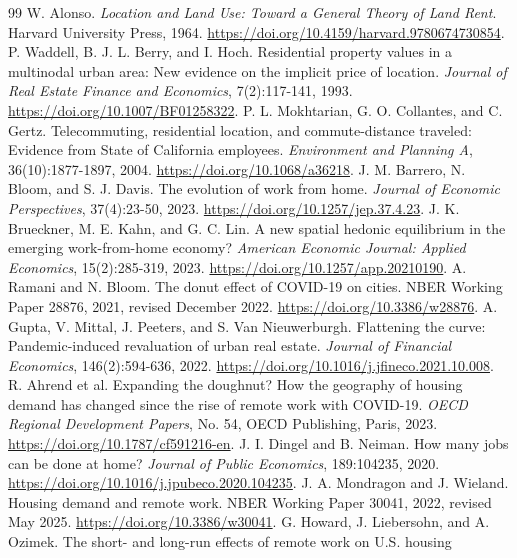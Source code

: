 \documentclass[11pt]{article}
\begin{document}
\clearpage
\footnotesize
\begin{thebibliography}{99}
\setlength{\itemsep}{3pt}
\setlength{\parsep}{0pt}
 W. Alonso. \textit{Location and Land Use: Toward a General Theory of Land Rent}. Harvard University
Press, 1964. \url{https://doi.org/10.4159/harvard.9780674730854}.
 P. Waddell, B. J. L. Berry, and I. Hoch. Residential property values in a multinodal urban area:
New evidence on the implicit price of location. \textit{Journal of Real Estate Finance and Economics}, 7(2):117-141, 1993.
\url{https://doi.org/10.1007/BF01258322}.
 P. L. Mokhtarian, G. O. Collantes, and C. Gertz. Telecommuting, residential location, and
commute-distance traveled: Evidence from State of California employees. \textit{Environment and Planning A}, 36(10):1877-1897, 2004.
\url{https://doi.org/10.1068/a36218}.
 J. M. Barrero, N. Bloom, and S. J. Davis. The evolution of work from home. \textit{Journal of
Economic Perspectives}, 37(4):23-50, 2023. \url{https://doi.org/10.1257/jep.37.4.23}.
 J. K. Brueckner, M. E. Kahn, and G. C. Lin. A new spatial hedonic equilibrium in the emerging
work-from-home economy? \textit{American Economic Journal: Applied Economics}, 15(2):285-319, 2023.
\url{https://doi.org/10.1257/app.20210190}.
 A. Ramani and N. Bloom. The donut effect of COVID-19 on cities. NBER Working Paper 28876, 2021,
revised December 2022. \url{https://doi.org/10.3386/w28876}.
 A. Gupta, V. Mittal, J. Peeters, and S. Van Nieuwerburgh. Flattening the curve: Pandemic-induced
revaluation of urban real estate. \textit{Journal of Financial Economics}, 146(2):594-636, 2022.
\url{https://doi.org/10.1016/j.jfineco.2021.10.008}.
 R. Ahrend et al. Expanding the doughnut? How the geography of housing demand has changed since the
rise of remote work with COVID-19. \textit{OECD Regional Development Papers}, No. 54, OECD Publishing, Paris, 2023.
\url{https://doi.org/10.1787/cf591216-en}.
 J. I. Dingel and B. Neiman. How many jobs can be done at home? \textit{Journal of Public Economics},
189:104235, 2020. \url{https://doi.org/10.1016/j.jpubeco.2020.104235}.
 J. A. Mondragon and J. Wieland. Housing demand and remote work. NBER Working Paper 30041, 2022,
revised May 2025. \url{https://doi.org/10.3386/w30041}.
 G. Howard, J. Liebersohn, and A. Ozimek. The short- and long-run effects of remote work on U.S. housing

\end{thebibliography}
\end{document}
